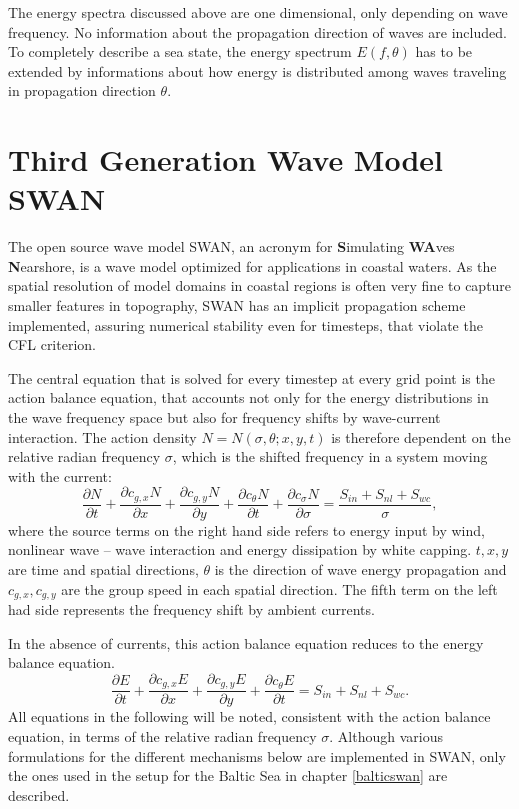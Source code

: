 The energy spectra discussed above are one dimensional, only depending on wave 
frequency. No information about the propagation direction of waves are 
included. To completely describe a sea state, the energy spectrum $E(f,\theta)$ 
has to be extended by informations about how energy is distributed among waves 
traveling in propagation direction $\theta$.

\section{Third Generation Wave Model SWAN}

The open source wave model SWAN, an acronym for \textbf{S}imulating \textbf{WA}ves \textbf{N}earshore, is a wave model optimized for applications in coastal waters. As the spatial resolution of model domains in coastal regions is often very fine to capture smaller features in topography, SWAN has an implicit propagation scheme implemented, assuring numerical stability even for timesteps, that violate the CFL criterion. 

The central equation that is solved for every timestep at every grid point is 
the action balance equation, that accounts not only for the energy distributions 
in the wave frequency space but also for frequency shifts by wave-current 
interaction. The action density $N=N(\sigma,\theta; x,y,t)$ is therefore 
dependent on the relative radian frequency $\sigma$, which is the shifted 
frequency in a system moving with the current:
\begin{equation}\label{ebe}
 \frac{\partial N}{\partial t} + \frac{\partial c_{g,x} N}{\partial x} + \frac{ \partial c_{g,y} N}{\partial y} + \frac{\partial c_{\theta} N}{\partial t} + \frac{\partial c_{\sigma} N}{\partial \sigma}= \frac{S_{in} + S_{nl} + S_{wc}}{\sigma},
\end{equation}
where the source terms on the right hand side refers to energy input by wind, 
nonlinear wave -- wave interaction and energy dissipation by white capping. $t, 
x ,y$ are time and spatial directions, $\theta$ is the direction of wave energy 
propagation and $c_{g,x}, c_{g,y}$ are the group speed in each spatial 
direction. The fifth term on the left had side represents the frequency shift by 
ambient currents.

In the absence of currents, this action balance equation reduces to the energy balance equation.
\begin{equation}\label{ebe}
 \frac{\partial E}{\partial t} + \frac{\partial c_{g,x} E}{\partial x} + \frac{ \partial c_{g,y} E}{\partial y} + \frac{\partial c_{\theta} E}{\partial t} = S_{in} + S_{nl} + S_{wc}.
\end{equation}
All equations in the following will be noted, consistent with the action balance equation, in terms of the relative radian frequency $\sigma$. Although various formulations for the different mechanisms below are implemented in SWAN, only the ones used in the setup for the Baltic Sea in chapter \ref{balticswan} are described.

